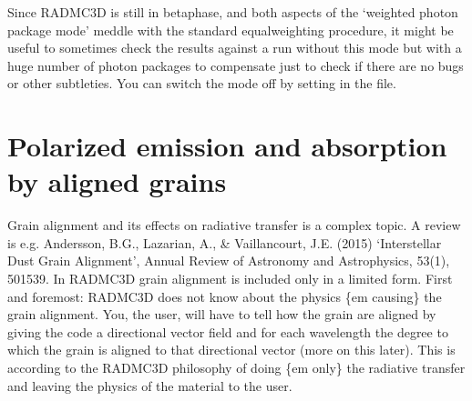\documentclass[letterpaper,10pt,english]{sphinxmanual}
\begin{document}
 Since RADMC\sphinxhyphen{}3D is still in beta\sphinxhyphen{}phase, and both aspects of the ‘weighted
photon package mode’ meddle with the standard equal\sphinxhyphen{}weighting procedure, it
might be useful to sometimes check the results against a run without this mode
but with a huge number of photon packages to compensate \sphinxhyphen{} just to check if there
are no bugs or other subtleties. You can switch the mode off by setting
 in the  file.


\section{Polarized emission and absorption by aligned grains}
\label{\detokenize{dustradtrans:polarized-emission-and-absorption-by-aligned-grains}}\label{\detokenize{dustradtrans:sec-polarized-thermal-emission}}

Grain alignment and its effects on radiative transfer is a complex topic. A
review is e.g. Andersson, B.G., Lazarian, A., \& Vaillancourt, J.E. (2015)
‘Interstellar Dust Grain Alignment’, Annual Review of Astronomy and
Astrophysics, 53(1), 501\textendash{}539. In RADMC\sphinxhyphen{}3D grain alignment is included only in a
limited form. First and foremost: RADMC\sphinxhyphen{}3D does not know about the physics \{em
causing\} the grain alignment. You, the user, will have to tell how the grain are
aligned by giving the code a directional vector field and for each wavelength
the degree to which the grain is aligned to that directional vector (more on
this later). This is according to the RADMC\sphinxhyphen{}3D philosophy of doing \{em only\}
the radiative transfer and leaving the physics of the material to the user.
\end{document}
